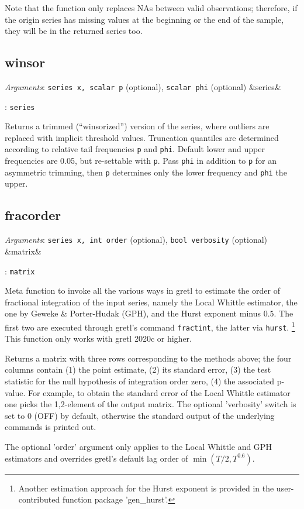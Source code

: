 \documentclass[11pt,english]{article}
\newcommand{\ArgRet}[2]{%
  {\it Arguments}: {#1}%
  \ifx&#2&%
  \else
  \par\smallskip\noindent {\it Return type}: \texttt{#2}
  \fi%
  \par\medskip\par%
  }
\begin{document}
Note that the function only replaces NAs between valid observations;
therefore, if the origin series has missing values at the beginning or
the end of the sample, they will be in the returned series too.

\subsection{winsor}

\ArgRet{\texttt{series x, scalar p} (optional), \texttt{scalar
phi} (optional)}{series}

Returns a trimmed (``winsorized'') version
of the series, where outliers are replaced with implicit threshold
values. Truncation quantiles are determined according to relative
tail frequencies \texttt{p} and \texttt{phi}. Default lower and upper
frequencies are 0.05, but re-settable with \texttt{p}. Pass \texttt{phi}
in addition to \texttt{p} for an asymmetric trimming, then \texttt{p}
determines only the lower frequency and \texttt{phi} the upper. 

\subsection{fracorder}

\ArgRet{\texttt{series x, int order} (optional), \texttt{bool verbosity} (optional)}{matrix}

Meta function to invoke all the various ways in gretl to estimate the order of fractional 
integration of the input series, namely the Local Whittle estimator, the one by 
Geweke \& Porter-Hudak (GPH), and the Hurst exponent minus $0.5$. The first two 
are executed through gretl's command \texttt{fractint}, the latter via \texttt{hurst}.%
\footnote{Another estimation approach for the Hurst exponent is provided in the 
user-contributed function package 'gen\_hurst'.}
This function only works with gretl 2020c or higher.

Returns a matrix with three rows corresponding to the methods above; the four columns
contain (1) the point estimate, (2) its standard error, (3) the test statistic for the null
hypothesis of integration order zero, (4) the associated p-value. For example, to obtain 
the standard error of the Local Whittle estimator one picks the 1,2-element of the output
matrix. The optional 'verbosity' switch is set to 0 (OFF) by default, otherwise the standard
output of the underlying commands is printed out.

The optional 'order' argument only applies to the Local Whittle and GPH estimators and 
overrides gretl's default lag order of $\min(T/2, T^{0.6})$. 
\end{document}
